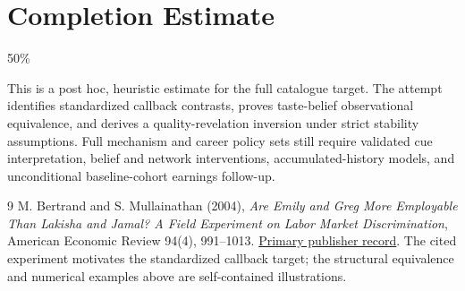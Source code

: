\documentclass[11pt,a4paper]{article}
\begin{document}
\section{Completion Estimate}
50\%

This is a post hoc, heuristic estimate for the full catalogue target.
The attempt identifies standardized callback contrasts, proves taste-belief observational equivalence, and derives a quality-revelation inversion under strict stability assumptions. Full mechanism and career policy sets still require validated cue interpretation, belief and network interventions, accumulated-history models, and unconditional baseline-cohort earnings follow-up.

\begin{thebibliography}{9}
 M. Bertrand and S. Mullainathan (2004), \emph{Are Emily and Greg More Employable Than Lakisha and Jamal? A Field Experiment on Labor Market Discrimination}, American Economic Review 94(4), 991--1013. \href{https://www.aeaweb.org/articles?id=10.1257/0002828042002561}{Primary publisher record}. The cited experiment motivates the standardized callback target; the structural equivalence and numerical examples above are self-contained illustrations.
\end{thebibliography}
\end{document}
